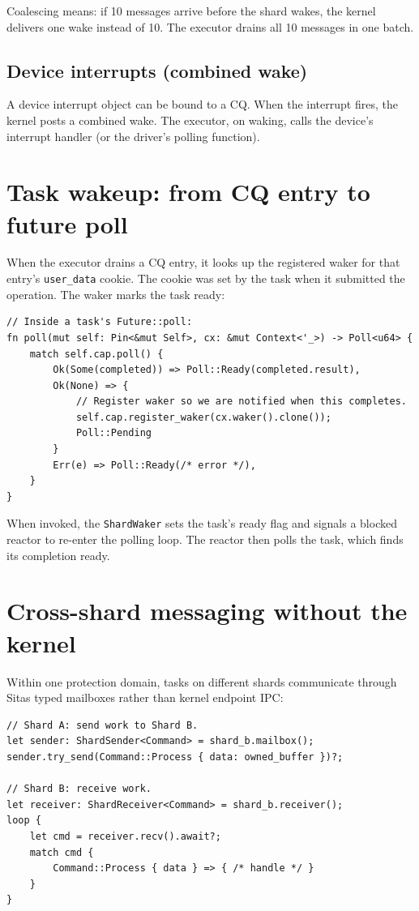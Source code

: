 Coalescing means: if 10 messages arrive before the shard wakes, the kernel
delivers one wake instead of 10. The executor drains all 10 messages in one batch.

\subsection{Device interrupts (combined wake)}

A device interrupt object can be bound to a CQ. When the interrupt fires, the
kernel posts a combined wake. The executor, on waking, calls the device's
interrupt handler (or the driver's polling function).

\section{Task wakeup: from CQ entry to future poll}

When the executor drains a CQ entry, it looks up the registered waker for that
entry's \texttt{user\_data} cookie. The cookie was set by the task when it
submitted the operation. The waker marks the task ready:

\begin{lstlisting}[style=rustCode]
// Inside a task's Future::poll:
fn poll(mut self: Pin<&mut Self>, cx: &mut Context<'_>) -> Poll<u64> {
    match self.cap.poll() {
        Ok(Some(completed)) => Poll::Ready(completed.result),
        Ok(None) => {
            // Register waker so we are notified when this completes.
            self.cap.register_waker(cx.waker().clone());
            Poll::Pending
        }
        Err(e) => Poll::Ready(/* error */),
    }
}
\end{lstlisting}

When invoked, the \texttt{ShardWaker} sets the task's ready flag and signals a
blocked reactor to re-enter the polling loop. The reactor then polls the task,
which finds its completion ready.

\section{Cross-shard messaging without the kernel}
\label{sec:sitas-cross-shard-messaging}

Within one protection domain, tasks on different shards communicate through Sitas
typed mailboxes rather than kernel endpoint IPC:

\begin{lstlisting}[style=rustCode]
// Shard A: send work to Shard B.
let sender: ShardSender<Command> = shard_b.mailbox();
sender.try_send(Command::Process { data: owned_buffer })?;

// Shard B: receive work.
let receiver: ShardReceiver<Command> = shard_b.receiver();
loop {
    let cmd = receiver.recv().await?;
    match cmd {
        Command::Process { data } => { /* handle */ }
    }
}
\end{lstlisting}

